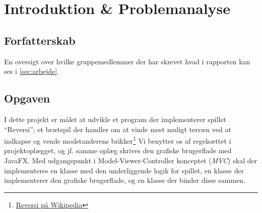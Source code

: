\section{Introduktion \& Problemanalyse}
\subsection{Forfatterskab}
En oversigt over hvilke gruppemedlemmer der har skrevet hvad i rapporten kan ses i \cref{sec:arbejde}.
\subsection{Opgaven}
I dette projekt er målet at udvikle et program der implementerer spillet ``Reversi''; et brætspil der handler om at vinde mest muligt terræn ved at indkapse og vende modstanderens brikker\footnote{\href{https://www.wikiwand.com/en/Reversi}{Reversi på Wikipedia}} Vi benytter os af regelsættet i projektoplægget, og jf. samme oplæg skrives den grafiske brugerflade med JavaFX.\newline
Med udgangspunkt i Model-Viewer-Controller konceptet (\emph{MVC}) skal der implementeres en klasse med den underliggende logik for spillet, en klasse der implementerer den grafiske brugerflade, og en klasse der binder disse sammen.
